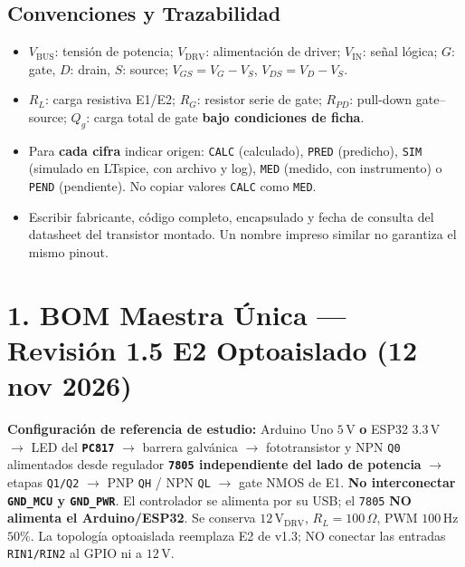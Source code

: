 \documentclass[10pt, a4paper, landscape]{article}
\begin{document}
\subsection*{Convenciones y Trazabilidad}
\begin{itemize}[noitemsep, topsep=2pt]
    \item $V_{\text{BUS}}$: tensión de potencia; $V_{\text{DRV}}$: alimentación de driver; $V_{\text{IN}}$: señal lógica; $G$: gate, $D$: drain, $S$: source; $V_{GS} = V_G - V_S$, $V_{DS} = V_D - V_S$.
    \item $R_L$: carga resistiva E1/E2; $R_G$: resistor serie de gate; $R_{PD}$: pull-down gate--source; $Q_g$: carga total de gate \textbf{bajo condiciones de ficha}.
    \item Para \textbf{cada cifra} indicar origen: \texttt{CALC} (calculado), \texttt{PRED} (predicho), \texttt{SIM} (simulado en LTspice, con archivo y log), \texttt{MED} (medido, con instrumento) o \texttt{PEND} (pendiente). No copiar valores \texttt{CALC} como \texttt{MED}.
    \item Escribir fabricante, código completo, encapsulado y fecha de consulta del datasheet del transistor montado. Un nombre impreso similar no garantiza el mismo pinout.
\end{itemize}

\newpage
\section*{1. BOM Maestra Única — Revisión 1.5 E2 Optoaislado (12 nov 2026)}

\textbf{Configuración de referencia de estudio:} Arduino Uno $5\,\text{V}$ \textbf{o} ESP32 $3.3\,\text{V}$ $\rightarrow$ LED del \textbf{\texttt{PC817}} $\rightarrow$ barrera galvánica $\rightarrow$ fototransistor y NPN \texttt{Q0} alimentados desde regulador \textbf{\texttt{7805} independiente del lado de potencia} $\rightarrow$ etapas \texttt{Q1/Q2} $\rightarrow$ PNP \texttt{QH} / NPN \texttt{QL} $\rightarrow$ gate NMOS de E1. \textbf{\textcolor{warnred}{No interconectar \texttt{GND\_MCU} y \texttt{GND\_PWR}}}. El controlador se alimenta por su USB; el \texttt{7805} \textbf{NO alimenta el Arduino/ESP32}. Se conserva $12\,\text{V}_{\text{DRV}}$, $R_L=100\,\Omega$, PWM $100\,\text{Hz}$ $50\%$. La topología optoaislada reemplaza E2 de v1.3; NO conectar las entradas \texttt{RIN1/RIN2} al GPIO ni a $12\,\text{V}$.
\end{document}
